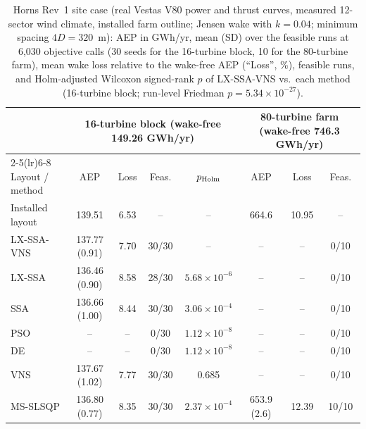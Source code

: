 \begin{table}[!t]
\centering
\caption{Horns Rev~1 site case (real Vestas V80 power and thrust curves, measured 12-sector wind climate, installed farm outline; Jensen wake with $k=0.04$; minimum spacing $4D=320$~m): AEP in GWh/yr, mean (SD) over the feasible runs at 6,030 objective calls (30 seeds for the 16-turbine block, 10 for the 80-turbine farm), mean wake loss relative to the wake-free AEP (``Loss'', \%), feasible runs, and Holm-adjusted Wilcoxon signed-rank $p$ of LX-SSA-VNS vs.\ each method (16-turbine block; run-level Friedman $p=5.34\times10^{-27}$).}
\label{tab:hr-site}
\footnotesize\setlength{\tabcolsep}{4pt}
\begin{tabular}{lccccccc}
\toprule
& \multicolumn{4}{c}{16-turbine block (wake-free 149.26 GWh/yr)} & \multicolumn{3}{c}{80-turbine farm (wake-free 746.3 GWh/yr)} \\
\cmidrule(lr){2-5}\cmidrule(lr){6-8}
Layout / method & AEP & Loss & Feas. & $p_{\rm Holm}$ & AEP & Loss & Feas. \\
\midrule
Installed layout & 139.51 & 6.53 & -- & -- & 664.6 & 10.95 & -- \\
\midrule
LX-SSA-VNS & 137.77 (0.91) & 7.70 & 30/30 & -- & -- & -- & 0/10 \\
LX-SSA & 136.46 (0.90) & 8.58 & 28/30 & $5.68\times10^{-6}$ & -- & -- & 0/10 \\
SSA & 136.66 (1.00) & 8.44 & 30/30 & $3.06\times10^{-4}$ & -- & -- & 0/10 \\
PSO & -- & -- & 0/30 & $1.12\times10^{-8}$ & -- & -- & 0/10 \\
DE & -- & -- & 0/30 & $1.12\times10^{-8}$ & -- & -- & 0/10 \\
VNS & 137.67 (1.02) & 7.77 & 30/30 & 0.685 & -- & -- & 0/10 \\
MS-SLSQP & 136.80 (0.77) & 8.35 & 30/30 & $2.37\times10^{-4}$ & 653.9 (2.6) & 12.39 & 10/10 \\
\bottomrule
\end{tabular}
\end{table}

